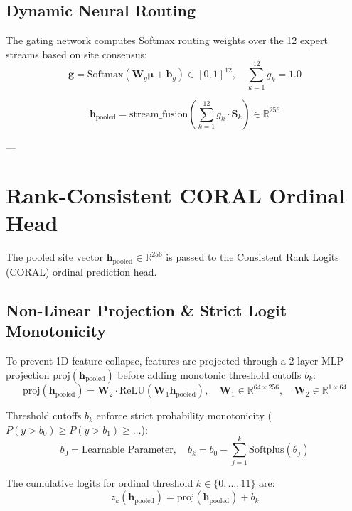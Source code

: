 \documentclass[11pt,a4paper]{article}
\begin{document}
\subsection{Dynamic Neural Routing}
The gating network computes Softmax routing weights over the 12 expert streams based on site consensus:
\begin{equation}
\mathbf{g} = \text{Softmax}\left( \mathbf{W}_g \boldsymbol{\mu} + \mathbf{b}_g \right) \in [0, 1]^{12}, \quad \sum_{k=1}^{12} g_k = 1.0
\end{equation}

\begin{equation}
\mathbf{h}_{\text{pooled}} = \text{stream\_fusion}\left( \sum_{k=1}^{12} g_k \cdot \mathbf{S}_k \right) \in \mathbb{R}^{256}
\end{equation}

---

\section{Rank-Consistent CORAL Ordinal Head}

The pooled site vector $\mathbf{h}_{\text{pooled}} \in \mathbb{R}^{256}$ is passed to the Consistent Rank Logits (CORAL) ordinal prediction head.

\subsection{Non-Linear Projection \& Strict Logit Monotonicity}
To prevent 1D feature collapse, features are projected through a 2-layer MLP projection $\text{proj}(\mathbf{h}_{\text{pooled}})$ before adding monotonic threshold cutoffs $b_k$:
\begin{equation}
\text{proj}(\mathbf{h}_{\text{pooled}}) = \mathbf{W}_2 \cdot \text{ReLU}(\mathbf{W}_1 \mathbf{h}_{\text{pooled}}), \quad \mathbf{W}_1 \in \mathbb{R}^{64 \times 256}, \quad \mathbf{W}_2 \in \mathbb{R}^{1 \times 64}
\end{equation}

Threshold cutoffs $b_k$ enforce strict probability monotonicity ($P(y > b_0) \ge P(y > b_1) \ge \dots$):
\begin{equation}
b_0 = \text{Learnable Parameter}, \quad b_k = b_0 - \sum_{j=1}^k \text{Softplus}(\theta_j)
\end{equation}

The cumulative logits for ordinal threshold $k \in \{0, \dots, 11\}$ are:
\begin{equation}
z_k(\mathbf{h}_{\text{pooled}}) = \text{proj}(\mathbf{h}_{\text{pooled}}) + b_k
\end{equation}
\end{document}
